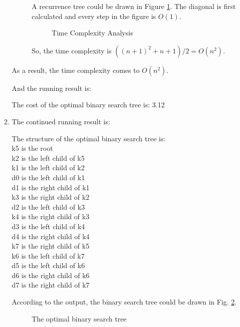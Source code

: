 \documentclass[12pt,a4paper]{article}
\theoremstyle{definition}
\begin{document}
\begin{enumerate}
\begin{enumerate}
\begin{description}
				A recurrence tree could be drawn in Figure \ref{fig:tc}. The diagonal is first calculated and every step in the figure is $O(1)$.
				\begin{figure}[h]
					\centering
					
					\caption{Time Complexity Analysis}
					\label{fig:tc}
				\end{figure}

				So, the time complexity is $((n+1)^2+n+1)/2 = O(n^2)$.
			\end{description}
			As a result, the time complexity comes to $O(n^2)$.

			And the running result is:
			\begin{tcolorbox}
The cost of the optimal binary search tree is: 3.12
			\end{tcolorbox}

			\item The continued running result is:
			\begin{tcolorbox}
The structure of the optimal binary search tree is:\\
k5 is the root\\
k2 is the left child of k5\\
k1 is the left child of k2\\
d0 is the left child of k1\\
d1 is the right child of k1\\
k3 is the right child of k2\\
d2 is the left child of k3\\
k4 is the right child of k3\\
d3 is the left child of k4\\
d4 is the right child of k4\\
k7 is the right child of k5\\
k6 is the left child of k7\\
d5 is the left child of k6\\
d6 is the right child of k6\\
d7 is the right child of k7
			\end{tcolorbox}

			According to the output, the binary search tree could be drawn in Fig. \ref{fig:bst}.

			\begin{figure}[h]
				\centering
				
				\caption{The optimal binary search tree}
				\label{fig:bst}
			\end{figure}


\end{enumerate}
\end{enumerate}
\end{document}
